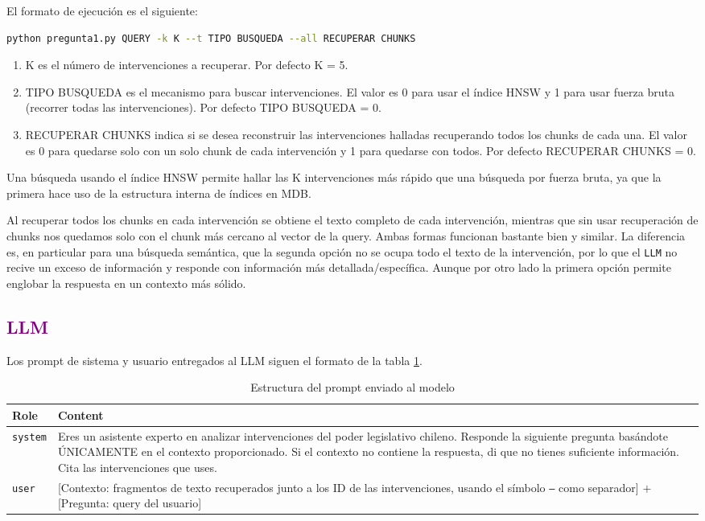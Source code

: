 \documentclass{article}
\begin{document}
El formato de ejecución es el siguiente: 
\begin{lstlisting}[language=Bash]
python pregunta1.py QUERY -k K --t TIPO BUSQUEDA --all RECUPERAR CHUNKS
\end{lstlisting}


\begin{enumerate}
    \item K es el número de intervenciones a recuperar. Por defecto K = 5.
    \item TIPO BUSQUEDA es el mecanismo para buscar intervenciones. El valor es 0 para usar el índice HNSW y 1 para usar fuerza bruta (recorrer todas las intervenciones). Por defecto TIPO BUSQUEDA = 0.
    \item RECUPERAR CHUNKS indica si se desea reconstruir las intervenciones halladas recuperando todos los chunks de cada una. El valor es 0 para quedarse solo con un solo chunk de cada intervención y 1 para quedarse con todos. Por defecto RECUPERAR CHUNKS = 0.
\end{enumerate}

Una búsqueda usando el índice HNSW permite hallar las K intervenciones más rápido que una búsqueda por fuerza bruta, ya que la primera hace uso de la estructura interna de índices en MDB.

Al recuperar todos los chunks en cada intervención se obtiene el texto completo de cada intervención, mientras que sin usar recuperación de chunks nos quedamos solo con el chunk más cercano al vector de la query. 
Ambas formas funcionan bastante bien y similar. La diferencia es, en particular para una búsqueda semántica, que la segunda opción no se ocupa todo el texto de la intervención, por lo que el \texttt{LLM} no recive un exceso de información y responde con información más detallada/específica. 
Aunque por otro lado la primera opción permite englobar la respuesta en un contexto más sólido.

\subsection*{\textcolor{purple}{LLM}}

Los prompt de sistema y usuario entregados al LLM siguen el formato de la tabla \ref{tab:p1_prompts}.

\begin{table}[h]
\centering
\caption{Estructura del prompt enviado al modelo}
\label{tab:p1_prompts}
\begin{tabular}{@{}l p{10cm}@{}}
\toprule
\textbf{Role} & \textbf{Content} \\
\midrule
\texttt{system} & Eres un asistente experto en analizar intervenciones del poder legislativo chileno.
Responde la siguiente pregunta basándote ÚNICAMENTE en el contexto proporcionado.
Si el contexto no contiene la respuesta, di que no tienes suficiente información.
Cita las intervenciones que uses. \\
\texttt{user} & [Contexto: fragmentos de texto recuperados junto a los ID de las intervenciones, usando el símbolo \texttt{---} como separador] $+$ [Pregunta: query del usuario]\\
\bottomrule
\end{tabular}
\end{table}
\end{document}
